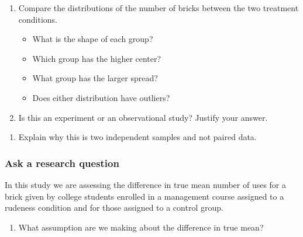 \documentclass[
]{report}
\providecommand{\tightlist}{%
  \setlength{\itemsep}{0pt}\setlength{\parskip}{0pt}}
\begin{document}
\begin{enumerate}
\def\labelenumi{\arabic{enumi}.}
\item
  Compare the distributions of the number of bricks between the two treatment conditions.

  \begin{itemize}
  \item
    What is the shape of each group?
    \vspace{0.3in}
  \item
    Which group has the higher center?
    \vspace{0.3in}
  \item
    What group has the larger spread?
    \vspace{0.3in}
  \item
    Does either distribution have outliers?
    \vspace{.3in}
  \end{itemize}
\item
  Is this an experiment or an observational study? Justify your answer.
\end{enumerate}

\vspace{1in}

\begin{enumerate}
\def\labelenumi{\arabic{enumi}.}
\setcounter{enumi}{2}
\tightlist
\item
  Explain why this is two independent samples and not paired data.
  \vspace{1in}
\end{enumerate}

\subsubsection*{Ask a research question}\label{ask-a-research-question-6}

In this study we are assessing the difference in true mean number of uses for a brick given by college students enrolled in a management course assigned to a rudeness condition and for those assigned to a control group.

\begin{enumerate}
\def\labelenumi{\arabic{enumi}.}
\setcounter{enumi}{3}
\tightlist
\item
  What assumption are we making about the difference in true mean?
\end{enumerate}

\vspace{0.8in}
\end{document}
